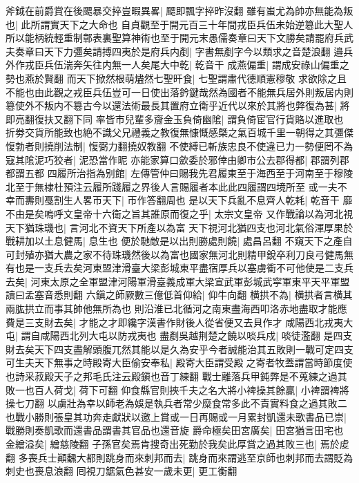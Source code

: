 斧鉞在前爵賞在後飃暴交捽豈暇異畧|{
	飃即飄字捽昨沒翻}
雖有蚩尤為帥亦無能為叛也|{
	此所謂實天下之大命也}
自貞觀至于開元百三十年間戎臣兵伍未始逆簒此大聖人所以能柄統輕重制鄣表裏聖算神術也至于開元末愚儒奏章曰天下文勝矣請罷府兵武夫奏章曰天下力彊矣請搏四夷於是府兵内剷|{
	字書無剷字今以類求之音楚浪翻}
邉兵外作戎臣兵伍湍奔矢往内無一人矣尾大中乾|{
	乾音干}
成燕偏重|{
	謂成安祿山偏重之勢也燕於賢翻}
而天下掀然根萌燼然七聖旰食|{
	七聖謂肅代德順憲穆敬}
求欲除之且不能也由此觀之戎臣兵伍豈可一日使出落鈐鍵哉然為國者不能無兵居外則叛居内則簒使外不叛内不簒古今以還法術最長其置府立衛乎近代以來於其將也弊復為甚|{
	將即亮翻復扶又翻下同}
率皆市兒輩多齎金玉負倚幽隂|{
	謂負倚宦官行貨賂以進取也}
折劵交貨所能致也絶不識父兄禮義之教復無慷慨感槩之氣百城千里一朝得之其彊傑愎勃者則撓削法制|{
	愎弼力翻撓奴教翻}
不使縛已斬族忠良不使違已力一勢便罔不為寇其隂泥巧狡者|{
	泥恐當作昵}
亦能家算口歛委於邪倖由卿市公去郡得都|{
	郡謂列郡都謂五都}
四履所治指為别館|{
	左傳管仲曰賜我先君履東至于海西至于河南至于穆陵北至于無棣杜預注云履所踐履之界後人言賜履者本此此四履謂四境所至}
或一夫不幸而夀則戞割生人畧帀天下|{
	帀作答翻周也}
是以天下兵亂不息齊人乾耗|{
	乾音干}
靡不由是矣嗚呼文皇帝十六衛之旨其誰原而復之乎|{
	太宗文皇帝}
又作戰論以為河北視天下猶珠璣也|{
	言河北不資天下所產以為富}
天下視河北猶四支也河北氣俗渾厚果於戰耕加以土息健馬|{
	息生也}
便於馳敵是以出則勝處則饒|{
	處昌呂翻}
不窺天下之產自可封殖亦猶大農之家不待珠璣然後以為富也國家無河北則精甲銳卒利刀良弓健馬無有也是一支兵去矣河東盟津滑臺大梁彭城東平盡宿厚兵以塞虜衝不可他使是二支兵去矣|{
	河東太原之全軍盟津河陽軍滑臺義成軍大梁宣武軍彭城武寜軍東平天平軍盟讀曰孟塞音悉則翻}
六鎭之師厥數三億低首仰給|{
	仰牛向翻}
横拱不為|{
	横拱者言横其兩肱拱立而事其帥他無所為也}
則沿淮已北循河之南東盡海西叩洛赤地盡取才能應費是三支財去矣|{
	才能之才即纔字漢書作財後人從省便又去貝作才}
咸陽西北戎夷大屯|{
	謂自咸陽西北列大屯以防戎夷也}
盡剷吳越荆楚之饒以啖兵戍|{
	啖徒濫翻}
是四支財去矣天下四支盡解頭腹兀然其能以是久為安乎今者誠能治其五敗則一戰可定四支可生夫天下無事之時殿寄大臣偷安奉私|{
	殿寄大臣謂受殿之寄者牧蓋謂當時節度使也詩采菽殿天子之邦毛氏注云殿鎭也音丁練翻}
戰士離落兵甲鈍弊是不蒐練之過其敗一也百人荷戈|{
	荷下可翻}
仰食縣官則挾千夫之名大將小禆操其餘贏|{
	小禆謂禆將操七刀翻}
以虜壯為幸以師老為娛是執兵者常少糜食常多此不責實料食之過其敗二也戰小勝則張皇其功奔走獻狀以邀上賞或一日再賜或一月累封凱還未歌書品已崇|{
	戰勝則奏凱歌而還書品謂書其官品也還音旋}
爵命極矣田宮廣矣|{
	田宮猶言田宅也}
金繒溢矣|{
	繒慈陵翻}
子孫官矣焉肯搜奇出死勤於我矣此厚賞之過其敗三也|{
	焉於䖍翻}
多喪兵士顚飜大都則跳身而來刺邦而去|{
	跳身而來謂逃至京師也刺邦而去謂貶為刺史也喪息浪翻}
囘視刀鋸氣色甚安一歲未更|{
	更工衡翻}
